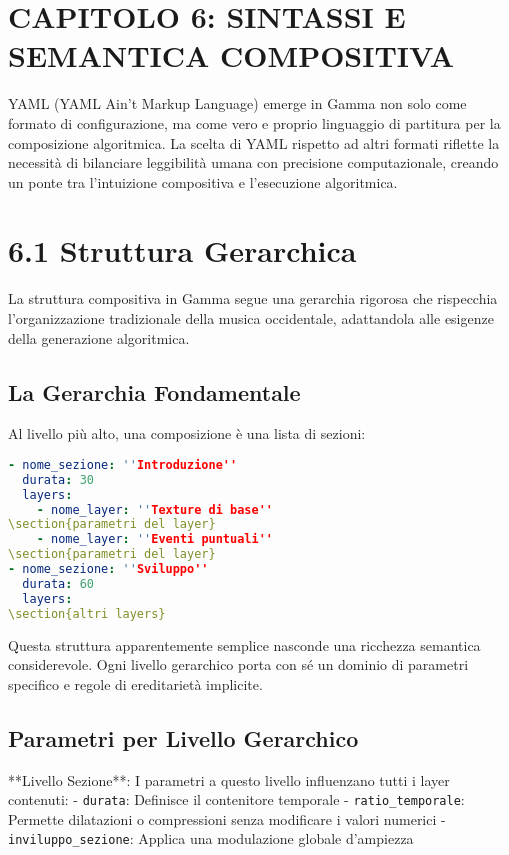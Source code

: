 
\section{CAPITOLO 6: SINTASSI E SEMANTICA COMPOSITIVA}
YAML (YAML Ain't Markup Language) emerge in Gamma non solo come formato di configurazione, ma come vero e proprio linguaggio di partitura per la composizione algoritmica. La scelta di YAML rispetto ad altri formati riflette la necessità di bilanciare leggibilità umana con precisione computazionale, creando un ponte tra l'intuizione compositiva e l'esecuzione algoritmica.
\section{6.1 Struttura Gerarchica}
La struttura compositiva in Gamma segue una gerarchia rigorosa che rispecchia l'organizzazione tradizionale della musica occidentale, adattandola alle esigenze della generazione algoritmica.
\subsection{La Gerarchia Fondamentale}
Al livello più alto, una composizione è una lista di sezioni:

\begin{lstlisting}[language=Yaml]
- nome_sezione: ''Introduzione''
  durata: 30
  layers:
    - nome_layer: ''Texture di base''
\section{parametri del layer}
    - nome_layer: ''Eventi puntuali''
\section{parametri del layer}
- nome_sezione: ''Sviluppo''
  durata: 60
  layers:
\section{altri layers}
\end{lstlisting}

Questa struttura apparentemente semplice nasconde una ricchezza semantica considerevole. Ogni livello gerarchico porta con sé un dominio di parametri specifico e regole di ereditarietà implicite.
\subsection{Parametri per Livello Gerarchico}
**Livello Sezione**: I parametri a questo livello influenzano tutti i layer contenuti:
- \texttt{durata}: Definisce il contenitore temporale
- \texttt{ratio\_temporale}: Permette dilatazioni o compressioni senza modificare i valori numerici
- \texttt{inviluppo\_sezione}: Applica una modulazione globale d'ampiezza

